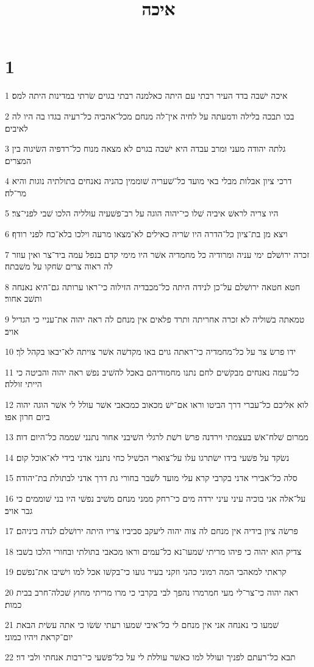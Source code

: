

\title{איכה}


\chapter{1}

\par 1 איכה ישׁבה בדד העיר רבתי עם היתה כאלמנה רבתי בגוים שׂרתי במדינות היתה למס׃
\par 2 בכו תבכה בלילה ודמעתה על לחיה אין־לה מנחם מכל־אהביה כל־רעיה בגדו בה היו לה לאיבים׃
\par 3 גלתה יהודה מעני ומרב עבדה היא ישׁבה בגוים לא מצאה מנוח כל־רדפיה השׂיגוה בין המצרים׃
\par 4 דרכי ציון אבלות מבלי באי מועד כל־שׁעריה שׁוממין כהניה נאנחים בתולתיה נוגות והיא מר־לה׃
\par 5 היו צריה לראשׁ איביה שׁלו כי־יהוה הוגה על רב־פשׁעיה עולליה הלכו שׁבי לפני־צר׃
\par 6 ויצא מן בת־ציון כל־הדרה היו שׂריה כאילים לא־מצאו מרעה וילכו בלא־כח לפני רודף׃
\par 7 זכרה ירושׁלם ימי עניה ומרודיה כל מחמדיה אשׁר היו מימי קדם בנפל עמה ביד־צר ואין עוזר לה ראוה צרים שׂחקו על משׁבתה׃
\par 8 חטא חטאה ירושׁלם על־כן לנידה היתה כל־מכבדיה הזילוה כי־ראו ערותה גם־היא נאנחה ותשׁב אחור׃
\par 9 טמאתה בשׁוליה לא זכרה אחריתה ותרד פלאים אין מנחם לה ראה יהוה את־עניי כי הגדיל אויב׃
\par 10 ידו פרשׂ צר על כל־מחמדיה כי־ראתה גוים באו מקדשׁה אשׁר צויתה לא־יבאו בקהל לך׃
\par 11 כל־עמה נאנחים מבקשׁים לחם נתנו מחמודיהם באכל להשׁיב נפשׁ ראה יהוה והביטה כי הייתי זוללה׃
\par 12 לוא אליכם כל־עברי דרך הביטו וראו אם־ישׁ מכאוב כמכאבי אשׁר עולל לי אשׁר הוגה יהוה ביום חרון אפו׃
\par 13 ממרום שׁלח־אשׁ בעצמתי וירדנה פרשׂ רשׁת לרגלי השׁיבני אחור נתנני שׁממה כל־היום דוה׃
\par 14 נשׂקד על פשׁעי בידו ישׂתרגו עלו על־צוארי הכשׁיל כחי נתנני אדני בידי לא־אוכל קום׃
\par 15 סלה כל־אבירי אדני בקרבי קרא עלי מועד לשׁבר בחורי גת דרך אדני לבתולת בת־יהודה׃
\par 16 על־אלה אני בוכיה עיני עיני ירדה מים כי־רחק ממני מנחם משׁיב נפשׁי היו בני שׁוממים כי גבר אויב׃
\par 17 פרשׂה ציון בידיה אין מנחם לה צוה יהוה ליעקב סביביו צריו היתה ירושׁלם לנדה ביניהם׃
\par 18 צדיק הוא יהוה כי פיהו מריתי שׁמעו־נא כל־עמים וראו מכאבי בתולתי ובחורי הלכו בשׁבי׃
\par 19 קראתי למאהבי המה רמוני כהני וזקני בעיר גועו כי־בקשׁו אכל למו וישׁיבו את־נפשׁם׃
\par 20 ראה יהוה כי־צר־לי מעי חמרמרו נהפך לבי בקרבי כי מרו מריתי מחוץ שׁכלה־חרב בבית כמות׃
\par 21 שׁמעו כי נאנחה אני אין מנחם לי כל־איבי שׁמעו רעתי שׂשׂו כי אתה עשׂית הבאת יום־קראת ויהיו כמוני׃
\par 22 תבא כל־רעתם לפניך ועולל למו כאשׁר עוללת לי על כל־פשׁעי כי־רבות אנחתי ולבי דוי׃

